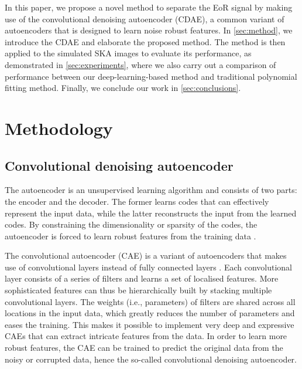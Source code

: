 \documentclass[letters,a4paper,fleqn,usenatbib]{mnras}
\begin{document}
In this paper, we propose a novel method to separate the EoR signal by
making use of the convolutional denoising autoencoder (CDAE), a common
variant of autoencoders that is designed to learn noise robust features.
In \autoref{sec:method}, we introduce the CDAE and elaborate the
proposed method.
The method is then applied to the simulated SKA images to evaluate its
performance, as demonstrated in \autoref{sec:experiments},
where we also carry out a comparison of performance between our
deep-learning-based method and traditional polynomial fitting method.
Finally, we conclude our work in \autoref{sec:conclusions}.


\section{Methodology}
\label{sec:method}

\subsection{Convolutional denoising autoencoder}
\label{sec:cdae}

The autoencoder is an unsupervised learning algorithm and consists of
two parts: the encoder and the decoder.
The former learns codes that can effectively represent the input data,
while the latter reconstructs the input from the learned codes.
By constraining the dimensionality or sparsity of the codes, the
autoencoder is forced to learn robust features from the training data
\citep[chapter 14]{goodfellow2016}.

The convolutional autoencoder (CAE) is a variant of autoencoders that
makes use of convolutional layers instead of fully connected layers
\citep{masci2011}.
Each convolutional layer consists of a series of filters and learns
a set of localised features.
More sophisticated features can thus be hierarchically built by stacking
multiple convolutional layers.
The weights (i.e., parameters) of filters are shared across all
locations in the input data, which greatly reduces the number of
parameters and eases the training.
This makes it possible to implement very deep and expressive CAEs that
can extract intricate features from the data.
In order to learn more robust features, the CAE can be trained to
predict the original data from the noisy or corrupted data, hence the
so-called convolutional denoising autoencoder.
\end{document}
